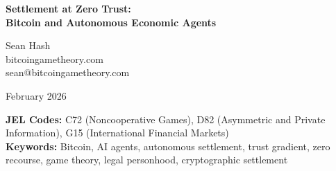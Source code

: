\documentclass[12pt]{article}
\theoremstyle{definition}
\theoremstyle{remark}
\begin{document}

\begin{center}
{\LARGE\bfseries Settlement at Zero Trust:\\Bitcoin and Autonomous Economic Agents}

\bigskip

{\large Sean Hash}\\
bitcoingametheory.com\\
sean@bitcoingametheory.com

\bigskip

February 2026

\medskip

{\small
\textbf{JEL Codes:} C72 (Noncooperative Games), D82 (Asymmetric and Private Information), G15 (International Financial Markets)\\[4pt]
\textbf{Keywords:} Bitcoin, AI agents, autonomous settlement, trust gradient, zero recourse, game theory, legal personhood, cryptographic settlement
}
\end{center}

\bigskip


\begin{abstract}
\noindent
As autonomous AI agents become economic actors, executing transactions
and holding assets, they face a settlement problem that human actors
prefer to solve but AI agents must solve. When a counterparty defects
against an AI agent, the agent cannot sue, cannot appeal to regulators,
and cannot retaliate through legal channels. The recourse vector is
zero. This paper formalizes the ``Trust Gradient'': the advantage of
neutral settlement over capturable settlement increases monotonically as
available legal recourse decreases. Human actors sit at various points
along this gradient; AI agents occupy the endpoint. Building on the Exit
Game (Hash, 2026a) and the axiom elimination (Hash, 2026b), we prove
that at zero recourse, Bitcoin is the uniquely rational settlement
choice --- the only mechanism that requires no trust in counterparties,
intermediaries, or legal systems. The analysis implies that AI agents
will be the fastest-adopting class of Bitcoin users, and that the
growing population of autonomous economic agents strengthens the
convergence pressure for all actors. The framework is falsifiable: if AI
agents gain legal personhood with enforceable rights, the limiting case
weakens.
\end{abstract}
\end{document}
